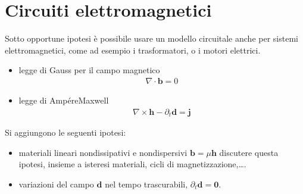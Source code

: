 \documentclass[letterpaper,10pt,english]{jupyterBook}
\begin{document}
\section{Circuiti elettromagnetici}
\label{\detokenize{ch/circuits-electromagnetic:circuiti-elettromagnetici}}\label{\detokenize{ch/circuits-electromagnetic:classical-electromagnetism-circuits-electromagnetic}}\label{\detokenize{ch/circuits-electromagnetic::doc}}
\sphinxAtStartPar
Sotto opportune ipotesi è possibile usare un modello circuitale anche per sistemi elettromagnetici, come ad esempio i trasformatori, o i motori elettrici.
\begin{itemize}
\item {} 
\sphinxAtStartPar
legge di Gauss per il campo magnetico
\begin{equation*}
\begin{split}\nabla \cdot \mathbf{b} = 0\end{split}
\end{equation*}
\item {} 
\sphinxAtStartPar
legge di Ampére\sphinxhyphen{}Maxwell
\begin{equation*}
\begin{split}\nabla \times \mathbf{h} - \partial_t \mathbf{d} = \mathbf{j}\end{split}
\end{equation*}
\end{itemize}

\sphinxAtStartPar
Si aggiungono le seguenti ipotesi:
\begin{itemize}
\item {} 
\sphinxAtStartPar
materiali lineari non\sphinxhyphen{}dissipativi e non\sphinxhyphen{}dispersivi \(\mathbf{b} = \mu \mathbf{h}\)  discutere questa ipotesi, insieme a isteresi materiali, cicli di magnetizzazione,….

\item {} 
\sphinxAtStartPar
variazioni del campo \(\mathbf{d}\) nel tempo trascurabili, \(\partial_t \mathbf{d} = \mathbf{0}\).

\end{itemize}
\end{document}
